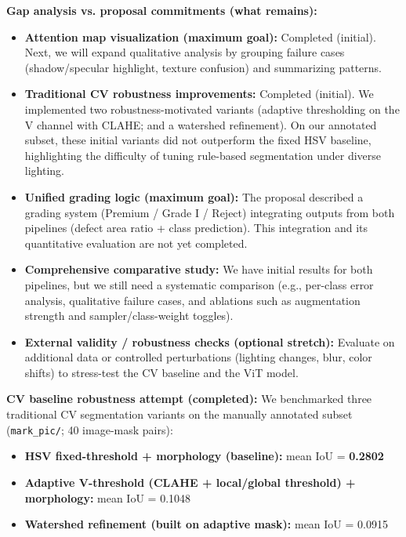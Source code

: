 \documentclass[11pt,letterpaper]{article}
\begin{document}
\vspace{0.5em}
\textbf{Gap analysis vs. proposal commitments (what remains):}
\begin{itemize}[noitemsep, topsep=0pt]
    \item \textbf{Attention map visualization (maximum goal):} Completed (initial). Next, we will expand qualitative analysis by grouping failure cases (shadow/specular highlight, texture confusion) and summarizing patterns.
    \item \textbf{Traditional CV robustness improvements:} Completed (initial). We implemented two robustness-motivated variants (adaptive thresholding on the V channel with CLAHE; and a watershed refinement). On our annotated subset, these initial variants did not outperform the fixed HSV baseline, highlighting the difficulty of tuning rule-based segmentation under diverse lighting.
    \item \textbf{Unified grading logic (maximum goal):} The proposal described a grading system (Premium / Grade I / Reject) integrating outputs from both pipelines (defect area ratio + class prediction). This integration and its quantitative evaluation are not yet completed.
    \item \textbf{Comprehensive comparative study:} We have initial results for both pipelines, but we still need a systematic comparison (e.g., per-class error analysis, qualitative failure cases, and ablations such as augmentation strength and sampler/class-weight toggles).
    \item \textbf{External validity / robustness checks (optional stretch):} Evaluate on additional data or controlled perturbations (lighting changes, blur, color shifts) to stress-test the CV baseline and the ViT model.
\end{itemize}

\vspace{0.5em}
\textbf{CV baseline robustness attempt (completed):} We benchmarked three traditional CV segmentation variants on the manually annotated subset (\texttt{mark\_pic/}; 40 image-mask pairs):
\begin{itemize}[noitemsep, topsep=0pt]
    \item \textbf{HSV fixed-threshold + morphology (baseline):} mean IoU = \textbf{0.2802}
    \item \textbf{Adaptive V-threshold (CLAHE + local/global threshold) + morphology:} mean IoU = 0.1048
    \item \textbf{Watershed refinement (built on adaptive mask):} mean IoU = 0.0915
\end{itemize}
\end{document}
